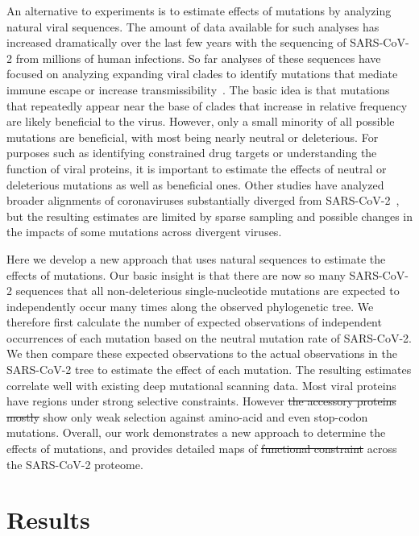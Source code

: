 \documentclass[9pt,twocolumn,twoside]{gsajnl_modified}
\providecommand{\DIFadd}[1]{{\protect\color{blue}\uwave{#1}}} %
\providecommand{\DIFdel}[1]{{\protect\color{red}\sout{#1}}}                      %
\providecommand{\DIFaddbegin}{} %
\providecommand{\DIFaddend}{} %
\providecommand{\DIFdelbegin}{} %
\providecommand{\DIFdelend}{} %
\begin{document}
An alternative to experiments is to estimate effects of mutations by analyzing natural viral sequences.
The amount of data available for such analyses has increased dramatically over the last few years with the sequencing of SARS-CoV-2 from millions of human infections.
So far analyses of these sequences have focused on analyzing expanding viral clades to identify mutations that mediate immune escape or increase transmissibility~\citep{obermeyer2022analysis,lee2022inferring,maher2022predicting}.
The basic idea is that mutations that repeatedly appear near the base of clades that increase in relative frequency are likely beneficial to the virus.
However, only a small minority of all possible mutations are beneficial, with most being nearly neutral or deleterious.
For purposes such as identifying constrained drug targets or understanding the function of viral proteins, it is important to estimate the effects of neutral or deleterious mutations as well as beneficial ones.
Other studies have analyzed broader alignments of coronaviruses substantially diverged from SARS-CoV-2~\citep{rodriguez2022epistatic, thadani2022learning}, but the resulting estimates are limited by sparse sampling and possible changes in the impacts of some mutations across divergent viruses.

Here we develop a new approach that uses natural sequences to estimate the effects of mutations.
Our basic insight is that there are now so many SARS-CoV-2 sequences that all non-deleterious single-nucleotide mutations are expected to independently occur many times along the observed phylogenetic tree.
We therefore first calculate the number of expected observations of independent occurrences of each mutation based on the neutral mutation rate of SARS-CoV-2.
We then compare these expected observations to the actual observations in the SARS-CoV-2 tree to estimate the effect of each mutation.
The resulting estimates correlate well with existing deep mutational scanning data.
Most viral proteins have regions under strong selective constraints.
However \DIFdelbegin \DIFdel{the accessory proteins mostly }\DIFdelend \DIFaddbegin \DIFadd{some accessory proteins }\DIFaddend show only weak selection against amino-acid and even stop-codon mutations.
Overall, our work demonstrates a new approach to determine the effects of mutations, and provides detailed maps of \DIFdelbegin \DIFdel{functional constraint }\DIFdelend \DIFaddbegin \DIFadd{mutational effects }\DIFaddend across the SARS-CoV-2 proteome.

\section{Results}
\end{document}
